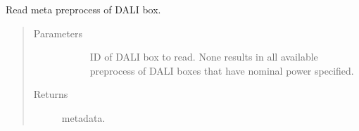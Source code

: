 \documentclass[letterpaper,10pt,english]{sphinxmanual}
\begin{document}

\begin{fulllineitems}
\label{\detokenize{autoapi/src/utils/snowflake/index:src.utils.snowflake.read_meta}}
Read meta preprocess of DALI box.
\begin{quote}\begin{description}
\item[{Parameters}] \leavevmode\begin{description}
\item[{}] \leavevmode{[}\sphinxhref{https://docs.python.org/3/library/stdtypes.html\#list}{\sphinxcode{\sphinxupquote{list}}}{]}
ID of DALI box to read.
None results in all available preprocess of DALI boxes that have nominal power specified.

\end{description}

\item[{Returns}] \leavevmode\begin{description}
\item[{  metadata.}] \leavevmode
\end{description}

\end{description}\end{quote}

\end{fulllineitems}

\end{document}

